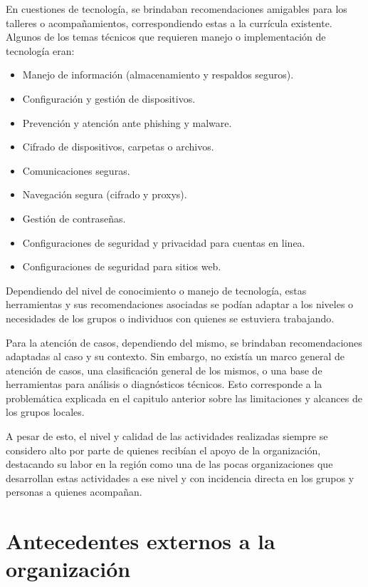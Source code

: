\documentclass[12pt]{caltech_thesis}
\begin{document}
En cuestiones de tecnología, se brindaban recomendaciones amigables para los talleres o acompañamientos, correspondiendo estas a la currícula existente. Algunos de los temas técnicos que requieren manejo o implementación de tecnología eran:

\begin{itemize}
    \item Manejo de información (almacenamiento y respaldos seguros).
    \item Configuración y gestión de dispositivos.
    \item Prevención y atención ante phishing y malware.
    \item Cifrado de dispositivos, carpetas o archivos.
    \item Comunicaciones seguras.
    \item Navegación segura (cifrado y proxys).
    \item Gestión de contraseñas.
    \item Configuraciones de seguridad y privacidad para cuentas en linea.
    \item Configuraciones de seguridad para sitios web.
\end{itemize}

Dependiendo del nivel de conocimiento o manejo de tecnología, estas herramientas y sus recomendaciones asociadas se podían adaptar a los niveles o necesidades de los grupos o individuos con quienes se estuviera trabajando.

Para la atención de casos, dependiendo del mismo, se brindaban recomendaciones adaptadas al caso y su contexto. Sin embargo, no existía un marco general de atención de casos, una clasificación general de los mismos, o una base de herramientas para análisis o diagnósticos técnicos. Esto corresponde a la problemática explicada en el capitulo anterior sobre las limitaciones y alcances de los grupos locales.

A pesar de esto, el nivel y calidad de las actividades realizadas siempre se considero alto por parte de quienes recibían el apoyo de la organización, destacando su labor en la región como una de las pocas organizaciones que desarrollan estas actividades a ese nivel y con incidencia directa en los grupos y personas a quienes acompañan.

\section{Antecedentes externos a la organización}
\end{document}
